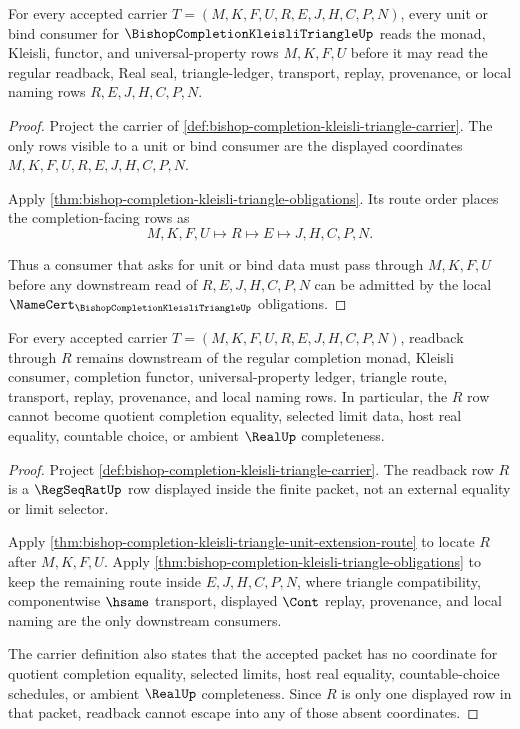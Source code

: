 \begin{theorem}
\label{thm:bishop-completion-kleisli-triangle-unit-extension-route}
For every accepted carrier $T=(M,K,F,U,R,E,J,H,C,P,N)$, every unit or bind consumer for $\BishopCompletionKleisliTriangleUp$ reads the monad, Kleisli, functor, and universal-property rows $M,K,F,U$ before it may read the regular readback, Real seal, triangle-ledger, transport, replay, provenance, or local naming rows $R,E,J,H,C,P,N$.
\end{theorem}
\begin{proof}
Project the carrier of \autoref{def:bishop-completion-kleisli-triangle-carrier}. The only rows visible to a unit or bind consumer are the displayed coordinates $M,K,F,U,R,E,J,H,C,P,N$.

Apply \autoref{thm:bishop-completion-kleisli-triangle-obligations}. Its route order places the completion-facing rows as
$$
M,K,F,U \longmapsto R \longmapsto E \longmapsto J,H,C,P,N .
$$

Thus a consumer that asks for unit or bind data must pass through $M,K,F,U$ before any downstream read of $R,E,J,H,C,P,N$ can be admitted by the local $\NameCert_{\BishopCompletionKleisliTriangleUp}$ obligations.
\end{proof}

\begin{theorem}
\label{thm:bishop-completion-kleisli-triangle-readback-nonescape}
For every accepted carrier $T=(M,K,F,U,R,E,J,H,C,P,N)$, readback through $R$ remains downstream of the regular completion monad, Kleisli consumer, completion functor, universal-property ledger, triangle route, transport, replay, provenance, and local naming rows. In particular, the $R$ row cannot become quotient completion equality, selected limit data, host real equality, countable choice, or ambient $\RealUp$ completeness.
\end{theorem}
\begin{proof}
Project \autoref{def:bishop-completion-kleisli-triangle-carrier}. The readback row $R$ is a $\RegSeqRatUp$ row displayed inside the finite packet, not an external equality or limit selector.

Apply \autoref{thm:bishop-completion-kleisli-triangle-unit-extension-route} to locate $R$ after $M,K,F,U$. Apply \autoref{thm:bishop-completion-kleisli-triangle-obligations} to keep the remaining route inside $E,J,H,C,P,N$, where triangle compatibility, componentwise $\hsame$ transport, displayed $\Cont$ replay, provenance, and local naming are the only downstream consumers.

The carrier definition also states that the accepted packet has no coordinate for quotient completion equality, selected limits, host real equality, countable-choice schedules, or ambient $\RealUp$ completeness. Since $R$ is only one displayed row in that packet, readback cannot escape into any of those absent coordinates.
\end{proof}

